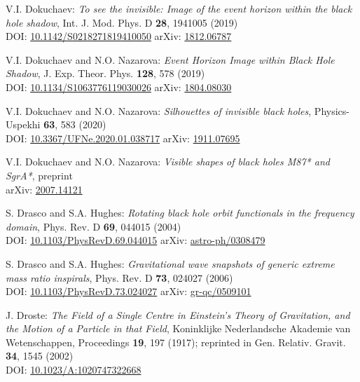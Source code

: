 \begin{thebibliography}{123}
V.I. Dokuchaev: {\em To see the invisible: Image of the event horizon within the black hole shadow},
Int. J. Mod. Phys. D {\bf 28}, 1941005 (2019)\\
DOI: \href{https://doi.org/10.1142/S0218271819410050}{10.1142/S0218271819410050}\hfill
arXiv: \href{https://arxiv.org/abs/1812.06787}{1812.06787}

V.I. Dokuchaev and N.O. Nazarova: {\em Event Horizon Image within Black Hole Shadow},
J. Exp. Theor. Phys. {\bf 128}, 578 (2019)\\
DOI: \href{https://doi.org/10.1134/S1063776119030026}{10.1134/S1063776119030026}\hfill
arXiv: \href{https://arxiv.org/abs/1804.08030}{1804.08030}

V.I. Dokuchaev and N.O. Nazarova: {\em Silhouettes of invisible black holes},
Physics-Uspekhi {\bf 63}, 583 (2020)\\
DOI: \href{https://doi.org/10.3367/UFNe.2020.01.038717}{10.3367/UFNe.2020.01.038717}\hfill
arXiv: \href{https://arxiv.org/abs/1911.07695}{1911.07695}

V.I. Dokuchaev and N.O. Nazarova: {\em Visible shapes of black holes M87* and SgrA*},
preprint\\
arXiv: \href{https://arxiv.org/abs/2007.14121}{2007.14121}

S. Drasco and S.A. Hughes:
{\em Rotating black hole orbit functionals in the frequency domain},
Phys. Rev. D {\bf 69}, 044015 (2004)\\
DOI: \href{https://doi.org/10.1103/PhysRevD.69.044015}{10.1103/PhysRevD.69.044015}\hfill
arXiv: \href{https://arxiv.org/abs/astro-ph/0308479}{astro-ph/0308479}

S. Drasco and S.A. Hughes:
{\em Gravitational wave snapshots of generic extreme mass ratio inspirals},
Phys. Rev. D {\bf 73}, 024027 (2006)\\
DOI: \href{https://doi.org/10.1103/PhysRevD.73.024027}{10.1103/PhysRevD.73.024027}\hfill
arXiv: \href{https://arxiv.org/abs/gr-qc/0509101}{gr-qc/0509101}

J. Droste:
{\em The Field of a Single Centre in Einstein's Theory of Gravitation, and the Motion of a Particle in that Field},
Koninklijke Nederlandsche Akademie van Wetenschappen, Proceedings {\bf 19}, 197 (1917);
reprinted in Gen. Relativ. Gravit. {\bf 34}, 1545 (2002)\\
DOI: \href{https://doi.org/10.1023/A:1020747322668}{10.1023/A:1020747322668}


\end{thebibliography}
